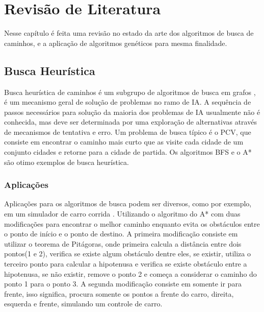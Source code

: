 \chapter[Revisão de Literatura]{Revisão de Literatura}


Nesse capítulo é feita uma revisão no estado da arte dos algoritmos de busca de caminhos, e a aplicação de algoritmos genéticos para mesma finalidade.

\section{Busca Heurística}

Busca heurística de caminhos é um subgrupo de algoritmos de busca em grafos \cite{Winston}, é um mecanismo geral de solução de problemas no ramo de IA. A sequência de passos necessários para solução da maioria dos problemas de IA usualmente não é conhecida, mas deve ser determinada por uma exploração de alternativas através de mecanismos de tentativa e erro. Um problema de busca típico é o PCV, que consiste em encontrar o caminho mais curto que as visite cada cidade de um conjunto cidades e retorne para a cidade de partida. Os algoritmos BFS e o A* são otimo exemplos de busca heurística. \cite{KORF199341}

\subsection{Aplicações}
Aplicações para os algoritmos de busca podem ser diversos, como por exemplo, em um simulador de carro corrida \cite{JungTing}. Utilizando o algoritmo do A* com duas modificações para encontrar o melhor caminho enquanto evita os obstáculos entre o ponto de início e o ponto de destino. 
A primeira modificação consiste em utilizar o teorema de Pitágoras, onde primeira calcula a distância entre dois pontos(1 e 2), verifica se existe algum obstáculo dentre eles, se existir, utiliza o terceiro ponto para calcular a hipotenusa e verifica se existe obstáculo entre a hipotenusa, se não existir, remove o ponto 2 e começa a considerar o caminho do ponto 1 para o ponto 3. A segunda modificação consiste em somente ir para frente, isso significa, procura somente os pontos a frente do carro, direita, esquerda e frente, simulando um controle de carro.


